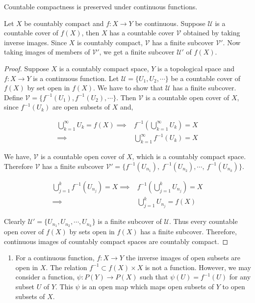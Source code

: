 \begin{theorem}
	Countable compactness is preserved under continuous functions.
	\cite[11.1.2]{joshi}
\end{theorem}
\begin{synopsis}
	Let $X$ be countably compact and $f:X\to Y$ be continuous.
	Suppose $\mathcal{U}$ is a countable cover of $f(X)$, then $X$ has a countable cover $\mathcal{V}$ obtained by taking inverse images.
	Since $X$ is countably compact, $\mathcal{V}$ has a finite subcover $\mathcal{V}'$.
	Now taking images of members of $\mathcal{V}'$, we get a finite subcover $\mathcal{U}'$ of $f(X)$.
\end{synopsis}
\begin{proof}
	Suppose $X$ is a countably compact space, $Y$ is a topological space and $f:X \to Y$ is a continuous function.
	Let $\mathcal{U} = \{ U_1, U_2,\cdots \}$ be a countable cover of $f(X)$ by set open in $f(X)$.
	We have to show that $\mathcal{U}$ has a finite subcover.\\


	Define $\mathcal{V} = \{ f^{-1}(U_1), f^{-1}(U_2), \cdots \}$.
	Then $\mathcal{V}$ is a countable open cover of $X$, since $f^{-1}(U_k)$ are open subsets of $X$ and,

\begin{align*}
	\bigcup_{k = 1}^\infty U_k = f(X) \implies & f^{-1}\left(\bigcup_{k=1}^\infty U_k\right) = X\\
	\implies & \bigcup_{k = 1}^\infty f^{-1}(U_k) = X
\end{align*}

	We have, $\mathcal{V}$ is a countable open cover of $X$, which is a countably compact space.
	Therefore $\mathcal{V}$ has a finite subcover $\mathcal{V}' = \{ f^{-1}(U_{n_1}),\ f^{-1}(U_{n_2}),\cdots,\ f^{-1}(U_{n_k}) \}$.

\begin{align*}
	\bigcup_{j=1}^k f^{-1}(U_{n_j}) = X \implies & f^{-1}\left(\bigcup_{j=1}^k U_{n_j}\right) = X\\
	\implies & \bigcup_{j=1}^k U_{n_j} = f(X)
\end{align*}

	Clearly $\mathcal{U}' = \{ U_{n_1},U_{n_2},\cdots,U_{n_k}\}$ is a finite subcover of $\mathcal{U}$.
	Thus every countable open cover of $f(X)$ by sets open in $f(X)$ has a finite subcover.
	Therefore, continuous images of countably compact spaces are countably compact.
\end{proof}

\begin{remark}
	\begin{enumerate}
		\item For a continuous function, $f : X \to Y$ the inverse images of open subsets are open in $X$.
			The relation $f^{-1} \subset f(X) \times X$ is not a function.
			However, we may consider a function, $\psi : P(Y) \to P(X)$ such that $\psi(U) = f^{-1}(U)$ for any subset $U$ of $Y$.
			This $\psi$ is an open map which maps open subsets of $Y$ to open subsets of $X$.
	\end{enumerate}
\end{remark}

